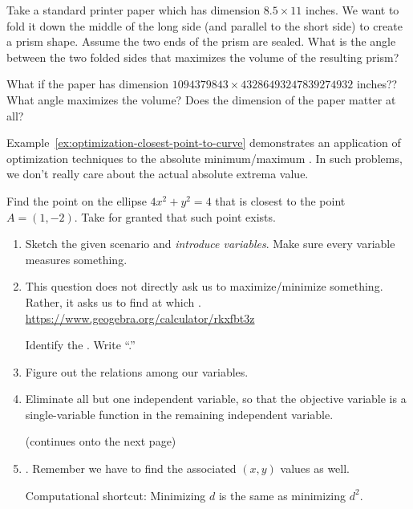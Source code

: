 \documentclass[../main.tex]{subfiles}
\begin{document}
\begin{example}
  Take a standard printer paper which has dimension \(8.5 \times 11\) inches. We want to fold it down the middle of the long side (and parallel to the short side) to create a prism shape. Assume the two ends of the prism are sealed. What is the angle between the two folded sides that maximizes the volume of the resulting prism?


  \faComment{} What if the paper has dimension \(1094379843 \times 43286493247839274932\) inches?? What angle maximizes the volume? Does the dimension of the paper matter at all?
\end{example}
\clearpage

Example~\ref{ex:optimization-closest-point-to-curve} demonstrates an application of optimization techniques to  the absolute minimum/maximum . In such problems, we don't really care about the actual absolute extrema value. 

\begin{example} \label{ex:optimization-closest-point-to-curve}
  Find the point on the ellipse \(4x^{2} + y^{2} = 4\) that is closest to the point \(A = (1,-2)\). Take for granted that such point exists.

  \begin{enumerate}
    \item Sketch the given scenario and \emph{introduce variables}. Make sure every variable measures something. 


    \item This question does not directly ask us to maximize/minimize something. Rather, it asks us to find \underline{\hspace{1in}} at which \underline{\hspace{2in}}. \url{https://www.geogebra.org/calculator/rkxfbt3z}

      Identify the . Write ``\emph{}.''


    \item Figure out the relations among our variables. 


    \item Eliminate all but one independent variable, so that the objective variable is a single-variable function in the remaining independent variable. 


      \vfill{}{\footnotesize (continues onto the next page)} \clearpage

    \item {}. Remember we have to find the associated \((x,y)\) values as well. 

      Computational shortcut: Minimizing \(d\) is the same as minimizing \(d^{2}\).

  \end{enumerate}
\end{example}
\clearpage
\end{document}
